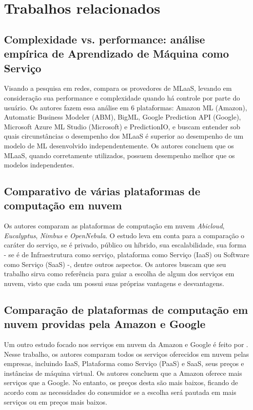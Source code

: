 \documentclass{article}
\begin{document}
\section{Trabalhos relacionados}
\subsection{Complexidade vs. performance: análise empírica de Aprendizado de Máquina como Serviço}
Visando a pesquisa em redes, \cite{yao2017} compara os provedores de MLaaS, levando em consideração sua performance e complexidade quando há controle por parte do usuário. Os autores fazem essa análise em 6 plataformas: Amazon ML (Amazon), Automatic Business Modeler (ABM), BigML, Google Prediction API (Google), Microsoft Azure ML Studio (Microsoft) e PredictionIO, e buscam entender sob quais circunstâncias o desempenho dos MLaaS é superior ao desempenho de um modelo de ML desenvolvido independentemente. Os autores concluem que os MLaaS, quando corretamente utilizados, possuem desempenho melhor que os modelos independentes. 

\subsection{Comparativo de várias plataformas de computação em nuvem}
Os autores \cite{peng2009comparison} comparam as plataformas de computação em nuvem \textit{Abicloud}, \textit{Eucalyptus}, \textit{Nimbus} e \textit{OpenNebula}. O estudo leva em conta para a comparação o caráter do serviço, se é privado, público ou híbrido, sua escalabilidade, sua forma - se é de Infraestrutura como serviço, plataforma como Serviço (IaaS) ou Software como Serviço (SaaS) -, dentre outros aspectos. Os autores buscam que seu trabalho sirva como referência para guiar a escolha de algum dos serviços em nuvem, visto que cada um possui suas próprias vantagens e desvantagens.

\subsection{Comparação de plataformas de computação em nuvem providas pela Amazon e Google}
Um outro estudo focado nos serviços em nuvem da Amazon e Google é feito por \cite{hyseni2017comparison}. Nesse trabalho, os autores comparam todos os serviços oferecidos em nuvem pelas empresas, incluindo IaaS, Plataforma como Serviço (PaaS) e SaaS, seus preços e instâncias de máquina virtual. Os autores concluem que a Amazon oferece mais serviços que a Google. No entanto, os preços desta são mais baixos, ficando de acordo com as necessidades do consumidor se a escolha será pautada em mais serviços ou em preços mais baixos.
\end{document}

